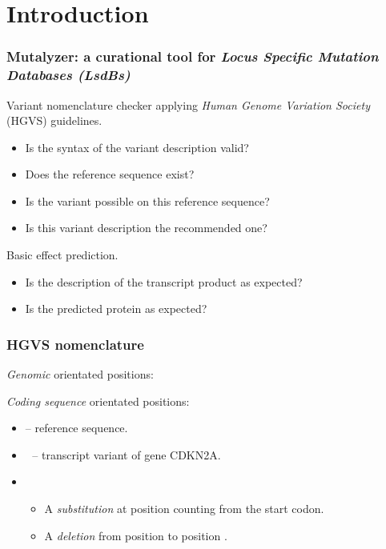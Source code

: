 

\section{Introduction}
\begin{frame}
  \frametitle{Mutalyzer: a curational tool for \emph{Locus Specific Mutation
    Databases (LsdBs)}}
  \medskip

  Variant nomenclature checker applying \emph{Human Genome Variation Society}
  (HGVS) guidelines.
  \medskip
  \pause
  \begin{itemize}
    \item Is the syntax of the variant description valid?
    \item Does the reference sequence exist?
    \item Is the variant possible on this reference sequence?
    \item Is this variant description the recommended one?
  \end{itemize}
  \bigskip
  \medskip
  \pause

  Basic effect prediction.
  \medskip
  \begin{itemize}
    \item Is the description of the transcript product as expected?
    \item Is the predicted protein as expected?
  \end{itemize}
\end{frame}

\begin{frame}
  \frametitle{HGVS nomenclature}

  \emph{Genomic} orientated positions:
  \begin{center}
  \end{center}
  \pause
  \bigskip
  \emph{Coding sequence} orientated positions:
  \begin{center}
  \end{center}
  \bigskip
  \pause
  \begin{itemize}
    \item {} -- reference sequence.
    \item {}$\;$ -- transcript variant  of gene CDKN2A.
    \item {}
    \begin{itemize}
      \item A \emph{substitution} at position  counting from the start
        codon.
      \item A \emph{deletion} from position  to position .
    \end{itemize}
  \end{itemize}
\end{frame}

